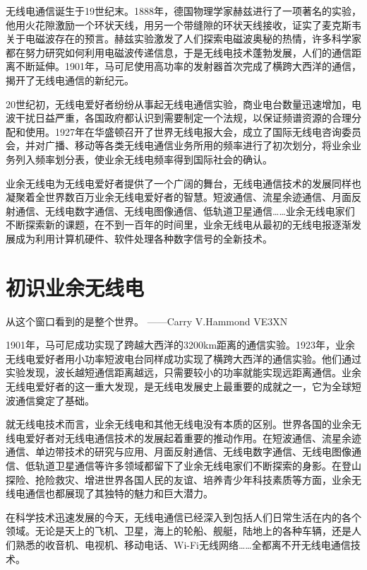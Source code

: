 \documentclass[12pt,UTF8]{ctexbook}
\begin{document}
\mainmatter

无线电通信诞生于19世纪末。1888年，德国物理学家赫兹进行了一项著名的实验，他用火花隙激励一个环状天线，用另一个带缝隙的环状天线接收，证实了麦克斯韦关于电磁波存在的预言。赫兹实验激发了人们探索电磁波奥秘的热情，许多科学家都在努力研究如何利用电磁波传递信息，于是无线电技术蓬勃发展，人们的通信距离不断延伸。1901年，马可尼使用高功率的发射器首次完成了横跨大西洋的通信，揭开了无线电通信的新纪元。

20世纪初，无线电爱好者纷纷从事起无线电通信实验，商业电台数量迅速增加，电波干扰日益严重，各国政府都认识到需要制定一个法规，以保证频谱资源的合理分配和使用。1927年在华盛顿召开了世界无线电报大会，成立了国际无线电咨询委员会，并对广播、移动等各类无线电通信业务所用的频率进行了初次划分，将业余业务列入频率划分表，使业余无线电频率得到国际社会的确认。

业余无线电为无线电爱好者提供了一个广阔的舞台，无线电通信技术的发展同样也凝聚着全世界数百万业余无线电爱好者的智慧。短波通信、流星余迹通信、月面反射通信、无线电数字通信、无线电图像通信、低轨道卫星通信……业余无线电家们不断探索新的课题，在不到一百年的时间里，业余无线电从最初的无线电报逐渐发展成为利用计算机硬件、软件处理各种数字信号的全新技术。

\chapter{初识业余无线电}

从这个窗口看到的是整个世界。
——Carry V.Hammond VE3XN

1901年，马可尼成功实现了跨越大西洋的3200km距离的通信实验。1923年，业余无线电爱好者用小功率短波电台同样成功实现了横跨大西洋的通信实验。他们通过实验发现，波长越短通信距离越远，只需要较小的功率就能实现远距离通信。业余无线电爱好者的这一重大发现，是无线电发展史上最重要的成就之一，它为全球短波通信奠定了基础。

就无线电技术而言，业余无线电和其他无线电没有本质的区别。世界各国的业余无线电爱好者对无线电通信技术的发展起着重要的推动作用。在短波通信、流星余迹通信、单边带技术的研究与应用、月面反射通信、无线电数字通信、无线电图像通信、低轨道卫星通信等许多领域都留下了业余无线电家们不断探索的身影。在登山探险、抢险救灾、增进世界各国人民的友谊、培养青少年科技素质等方面，业余无线电通信也都展现了其独特的魅力和巨大潜力。

在科学技术迅速发展的今天，无线电通信已经深入到包括人们日常生活在内的各个领域。无论是天上的飞机、卫星，海上的轮船、舰艇，陆地上的各种车辆，还是人们熟悉的收音机、电视机、移动电话、Wi-Fi无线网络……全都离不开无线电通信技术。
\end{document}
